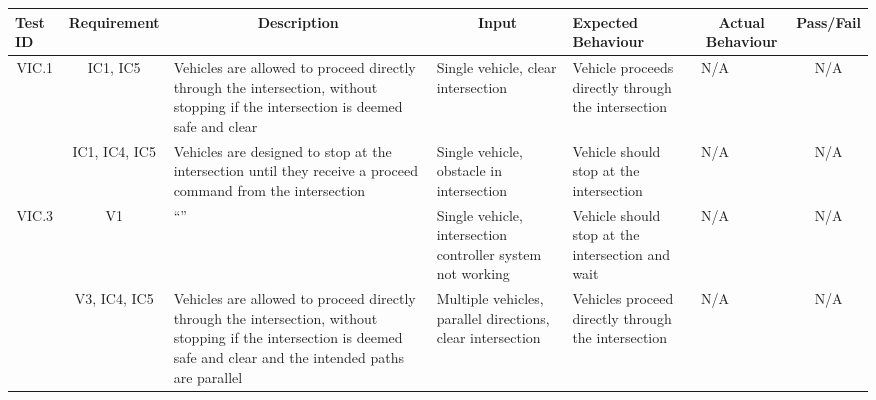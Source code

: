 \documentclass [10pt]{article}
\begin{document}
\begin{longtable}{ | p{ } | p{ } |  p{ } |  p{ } | p{ } | p{ } |  p{ } |}  \hline

    \rowcolor{subsectionC}\textbf{Test ID}
    & \multicolumn{1}{c|}{\textbf{Requirement} }
    &\multicolumn{1}{c|}{\textbf{Description} }
    & \multicolumn{1}{c|}{\textbf{Input} }
    & \textbf{Expected Behaviour} 
    & \multicolumn{1}{c|}{\textbf{Actual Behaviour} }
    & \multicolumn{1}{c|}{\textbf{Pass/Fail}} \\  \hline
    
    \multicolumn{1}{|c|}{VIC.1} 
    & \multicolumn{1}{c|}{IC1, IC5}
    &Vehicles are allowed to proceed directly through the intersection, without stopping if the intersection is deemed safe and clear
    & Single vehicle, clear intersection
    & Vehicle proceeds directly through the intersection
    & N/A 
    & \multicolumn{1}{c|}{N/A}\\ \hline
    
    \newpage\hline
    
    \rowcolor{tableCell}\multicolumn{1}{|c|}{VIC.2} 
    & \multicolumn{1}{c|}{IC1, IC4, IC5}
    & Vehicles are designed to stop at the intersection until they receive a proceed command from the intersection    
    & Single vehicle, obstacle in intersection
    & Vehicle should stop at the intersection
    & N/A
    & \multicolumn{1}{c|}{N/A}\\ \hline
    
    \multicolumn{1}{|c|}{VIC.3} 
    & \multicolumn{1}{c|}{V1}
    & ``''
    
    & Single vehicle, intersection controller system not working
    &  Vehicle should stop at the intersection and wait
    & N/A
    & \multicolumn{1}{c|}{N/A}\\ \hline
    
    
        \rowcolor{tableCell}\multicolumn{1}{|c|}{VIC.4} 
    & \multicolumn{1}{c|}{V3, IC4, IC5}
    & Vehicles are allowed to proceed directly through the intersection, without stopping if the intersection is deemed safe and clear and the intended paths are parallel
    & Multiple vehicles, parallel directions, clear intersection
    & Vehicles proceed directly through the intersection
    &  N/A
    & \multicolumn{1}{c|}{N/A}\\ \hline
    

\end{longtable}
\end{document}
